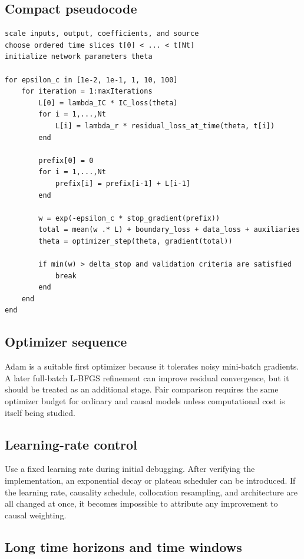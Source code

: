 \documentclass[11pt]{article}
\begin{document}
\subsection{Compact pseudocode}

\begin{verbatim}
scale inputs, output, coefficients, and source
choose ordered time slices t[0] < ... < t[Nt]
initialize network parameters theta

for epsilon_c in [1e-2, 1e-1, 1, 10, 100]
    for iteration = 1:maxIterations
        L[0] = lambda_IC * IC_loss(theta)
        for i = 1,...,Nt
            L[i] = lambda_r * residual_loss_at_time(theta, t[i])
        end

        prefix[0] = 0
        for i = 1,...,Nt
            prefix[i] = prefix[i-1] + L[i-1]
        end

        w = exp(-epsilon_c * stop_gradient(prefix))
        total = mean(w .* L) + boundary_loss + data_loss + auxiliaries
        theta = optimizer_step(theta, gradient(total))

        if min(w) > delta_stop and validation criteria are satisfied
            break
        end
    end
end
\end{verbatim}

\subsection{Optimizer sequence}

Adam is a suitable first optimizer because it tolerates noisy mini-batch gradients. A later full-batch L-BFGS refinement can improve residual convergence, but it should be treated as an additional stage. Fair comparison requires the same optimizer budget for ordinary and causal models unless computational cost is itself being studied.

\subsection{Learning-rate control}

Use a fixed learning rate during initial debugging. After verifying the implementation, an exponential decay or plateau scheduler can be introduced. If the learning rate, causality schedule, collocation resampling, and architecture are all changed at once, it becomes impossible to attribute any improvement to causal weighting.

\subsection{Long time horizons and time windows}
\end{document}
